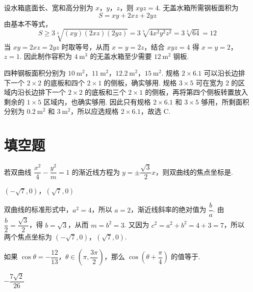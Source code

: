 \begin{solution}
设水箱底面长、宽和高分别为 \(x\)，\(y\)，\(z\)，则 \(xyz=4\). 无盖水箱所需钢板面积为
\[
S=xy+2xz+2yz
\]
由基本不等式，
\[
S\geqslant3\sqrt[3]{\left(xy\right)\left(2xz\right)\left(2yz\right)}=3\sqrt[3]{4x^{2}y^{2}z^{2}}=3\sqrt[3]{64}=12
\]
当 \(xy=2xz=2yz\) 时取等号，从而 \(x=y=2z\)，结合 \(xyz=4\) 得 \(x=y=2\)，\(z=1\). 因此制作容积为 \(4\mathrm{~m}^{3}\) 的无盖水箱至少需要 \(12\mathrm{~m}^{2}\) 钢板.

四种钢板面积分别为 \(10\mathrm{~m}^{2}\)，\(11\mathrm{~m}^{2}\)，\(12.2\mathrm{~m}^{2}\)，\(15\mathrm{~m}^{2}\). 规格 \(2\times6.1\) 可以沿长边排下一个 \(2\times2\) 的底板和四个 \(2\times1\) 的侧板，确实够用. 规格 \(3\times5\) 可在宽为 \(2\) 的区域内沿长边排下一个 \(2\times2\) 的底板和三个 \(2\times1\) 的侧板，再将第四个侧板转置放入剩余的 \(1\times5\) 区域内，也确实够用. 因此只有规格 \(2\times6.1\) 和 \(3\times5\) 够用，所剩面积分别为 \(0.2\mathrm{~m}^{2}\) 和 \(3\mathrm{~m}^{2}\)，所以应选规格 \(2\times6.1\)，故选 C.
\end{solution}

\section{填空题}

\begin{problem}
若双曲线 \(\dfrac{x^{2}}{4}-\dfrac{y^{2}}{m}=1\) 的渐近线方程为 \(y=\pm\dfrac{\sqrt{3}}{2}x\)，则双曲线的焦点坐标是\fillinblank{}.
\end{problem}

\begin{answer}
\(\left(-\sqrt{7},0\right)\)，\(\left(\sqrt{7},0\right)\)
\end{answer}

\begin{solution}
双曲线的标准形式中，\(a^{2}=4\)，所以 \(a=2\)，渐近线斜率的绝对值为 \(\dfrac{b}{a}\). 由
\(\dfrac{b}{2}=\dfrac{\sqrt{3}}{2}\)，得 \(b=\sqrt{3}\)，从而 \(m=b^{2}=3\). 又因为 \(c^{2}=a^{2}+b^{2}=4+3=7\)，所以两个焦点坐标为 \(\left(-\sqrt{7},0\right)\)，\(\left(\sqrt{7},0\right)\).
\end{solution}

\begin{problem}
如果 \(\cos\theta=-\dfrac{12}{13}\)，\(\theta\in\left(\pi,\dfrac{3\pi}{2}\right)\)，那么 \(\cos\left(\theta+\dfrac{\pi}{4}\right)\) 的值等于\fillinblank{}.
\end{problem}

\begin{answer}
\(-\dfrac{7\sqrt{2}}{26}\)
\end{answer}

